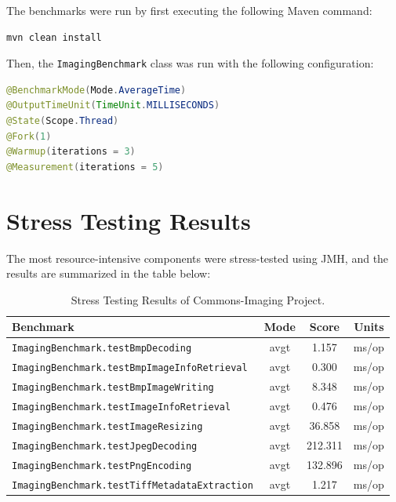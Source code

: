 \documentclass[a4paper,12pt]{report}
\begin{document}
The benchmarks were run by first executing the following Maven command:

\begin{lstlisting}[language=bash]
mvn clean install
\end{lstlisting}

Then, the \texttt{ImagingBenchmark} class was run with the following configuration:

\begin{lstlisting}[language=java, caption=ImagingBenchmark-configuration]
@BenchmarkMode(Mode.AverageTime)
@OutputTimeUnit(TimeUnit.MILLISECONDS)
@State(Scope.Thread)
@Fork(1)
@Warmup(iterations = 3)
@Measurement(iterations = 5)
\end{lstlisting}
\newpage
\section{Stress Testing Results}
The most resource-intensive components were stress-tested using JMH, and the results are summarized in the table below:

\begin{table}[H]
    \centering
    \begin{tabular}{|l|c|c|c|}
        \hline
        \textbf{Benchmark} & \textbf{Mode} & \textbf{Score} & \textbf{Units} \\ \hline
        \texttt{ImagingBenchmark.testBmpDecoding} & avgt & 1.157 & ms/op \\ \hline
        \texttt{ImagingBenchmark.testBmpImageInfoRetrieval} & avgt & 0.300 & ms/op \\ \hline
        \texttt{ImagingBenchmark.testBmpImageWriting} & avgt & 8.348 & ms/op \\ \hline
        \texttt{ImagingBenchmark.testImageInfoRetrieval} & avgt & 0.476 & ms/op \\ \hline
        \texttt{ImagingBenchmark.testImageResizing} & avgt & 36.858 & ms/op \\ \hline
        \texttt{ImagingBenchmark.testJpegDecoding} & avgt & 212.311 & ms/op \\ \hline
        \texttt{ImagingBenchmark.testPngEncoding} & avgt & 132.896 & ms/op \\ \hline
        \texttt{ImagingBenchmark.testTiffMetadataExtraction} & avgt & 1.217 & ms/op \\ \hline
    \end{tabular}
    \caption{Stress Testing Results of Commons-Imaging Project.}
    \label{tab:stress_testing_results}
\end{table}
\end{document}
